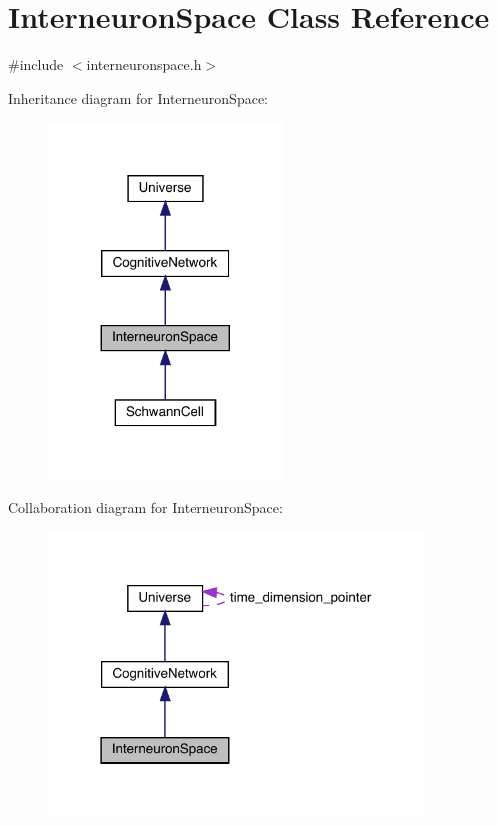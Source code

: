 \hypertarget{class_interneuron_space}{}\section{Interneuron\+Space Class Reference}
\label{class_interneuron_space}


{\ttfamily \#include $<$interneuronspace.\+h$>$}



Inheritance diagram for Interneuron\+Space\+:\nopagebreak
\begin{figure}[H]
\begin{center}
\leavevmode
\includegraphics[width=176pt]{class_interneuron_space__inherit__graph}
\end{center}
\end{figure}


Collaboration diagram for Interneuron\+Space\+:\nopagebreak
\begin{figure}[H]
\begin{center}
\leavevmode
\includegraphics[width=283pt]{class_interneuron_space__coll__graph}
\end{center}
\end{figure}
